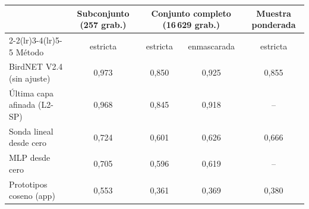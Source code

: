 \begin{tabular}{lcccc}
\toprule
 & Subconjunto (257 grab.) & \multicolumn{2}{c}{Conjunto completo (16\,629 grab.)} & Muestra ponderada\\
\cmidrule(lr){2-2}\cmidrule(lr){3-4}\cmidrule(lr){5-5}
M\'etodo & estricta & estricta & enmascarada & estricta\\
\midrule
BirdNET V2.4 (sin ajuste) & 0{,}973 & 0{,}850 & 0{,}925 & 0{,}855\\
\'Ultima capa afinada (L2-SP) & 0{,}968 & 0{,}845 & 0{,}918 & --\\
Sonda lineal desde cero & 0{,}724 & 0{,}601 & 0{,}626 & 0{,}666\\
MLP desde cero & 0{,}705 & 0{,}596 & 0{,}619 & --\\
Prototipos coseno (app) & 0{,}553 & 0{,}361 & 0{,}369 & 0{,}380\\
\bottomrule
\end{tabular}
